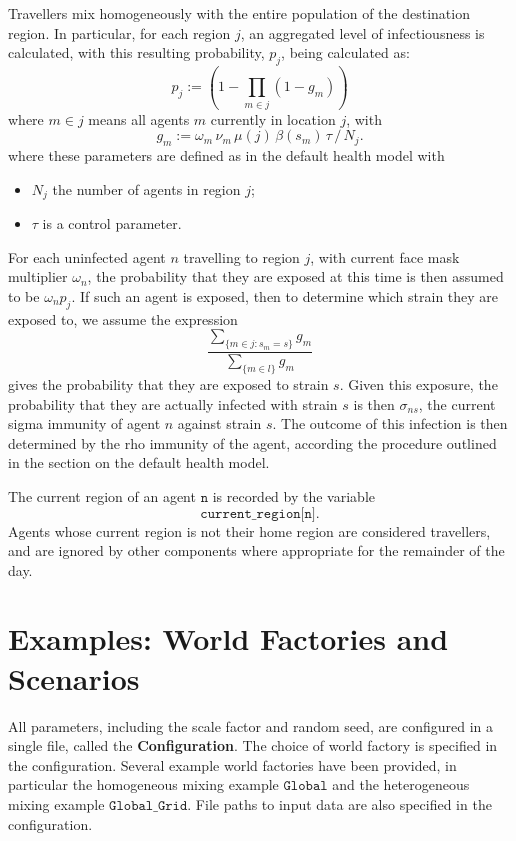 \documentclass[10pt,letterpaper]{article}
\begin{document}
Travellers mix homogeneously with the entire population of the destination region. In particular, for each region $j$, an aggregated level of infectiousness is calculated, with this resulting probability, $p_j$, being calculated as:
\begin{equation*}
p_j := \left(1 - \prod_{m \in j} (1 - g_m)\right)
\end{equation*}
where $m \in j$ means all agents $m$ currently in location $j$, with
\begin{equation*}
g_m  := \omega_m\, \nu_m\, \mu(j)\, \beta(s_m)\, \tau\, /\, N_j.
\end{equation*}
where these parameters are defined as in the default health model with
\begin{itemize}
\item $N_j$ the number of agents in region $j$;
\item $\tau$ is a control parameter.
\end{itemize}
For each uninfected agent $n$ travelling to region $j$, with current face mask multiplier $\omega_n$, the probability that they are exposed at this time is then assumed to be $\omega_n p_j$. If such an agent is exposed, then to determine which strain they are exposed to, we assume the expression
\begin{equation*}
\frac{\sum_{\{m \in j: s_m = s\}} g_m}{\sum_{\{m \in l\}} g_m}
\end{equation*}
gives the probability that they are exposed to strain $s$. Given this exposure, the probability that they are actually infected with strain $s$ is then $\sigma_{ns}$, the current sigma immunity of agent $n$ against strain $s$. The outcome of this infection is then determined by the rho immunity of the agent, according the procedure outlined in the section on the default health model.

The current region of an agent $\texttt{n}$ is recorded by the variable $$\texttt{current{\_}region[n]}.$$ Agents whose current region is not their home region are considered travellers, and are ignored by other components where appropriate for the remainder of the day.

\section{Examples: World Factories and Scenarios}

All parameters, including the scale factor and random seed, are configured in a single file, called the \textbf{Configuration}. The choice of world factory is specified in the configuration. Several example world factories have been provided, in particular the homogeneous mixing example $\texttt{Global}$ and the heterogeneous mixing example $\texttt{Global{\_}Grid}$. File paths to input data are also specified in the configuration. 
\end{document}
